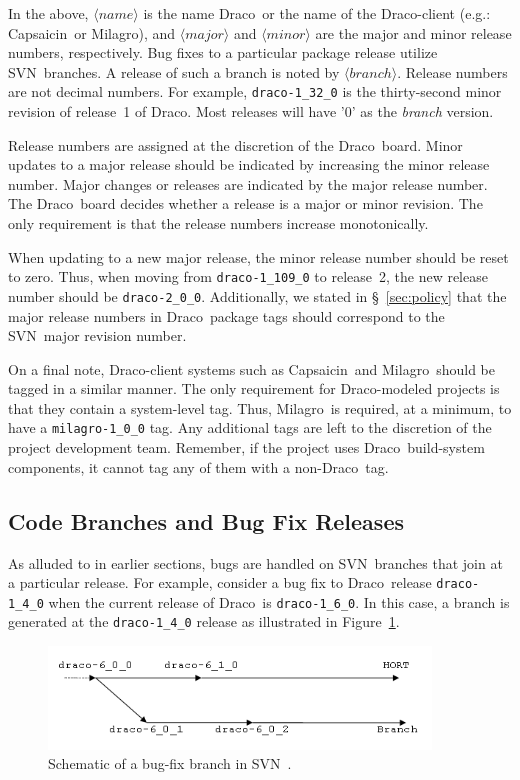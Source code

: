 \documentclass[note]{newmemo}
\newcommand{\draco}{{\normalfont\small\sffamily Draco}}
\newcommand{\milagro}{{\normalfont\small\sffamily Milagro}}
\newcommand{\capsaicin}{{\normalfont\small\sffamily Capsaicin}}
\newcommand{\svn}{\textsf{SVN}}
\begin{document}
In the above, $\langle\mathit{name}\rangle$ is the name \draco\ or the
name of the \draco-client (e.g.: \capsaicin\ or \milagro), and
$\langle\mathit{major}\rangle$ and $\langle\mathit{minor}\rangle$ are
the major and minor release numbers, respectively. Bug fixes to a
particular package release utilize \svn\  branches.  A release of
such a branch is noted by $\langle\mathit{branch}\rangle$.  Release
numbers are not decimal numbers.  For example, \texttt{draco-1\_32\_0}
is the thirty-second minor revision of release~1 of \draco.  Most
releases will have '0' as the \textit{branch} version.

Release numbers are assigned at the discretion of the \draco\ board.
Minor updates to a major release should be indicated by increasing the
minor release number.  Major changes or releases are indicated by the
major release number.  The \draco\ board decides whether a release is
a major or minor revision.  The only requirement is that the release
numbers increase monotonically.

When updating to a new major release, the minor release number should
be reset to zero.  Thus, when moving from \texttt{draco-1\_109\_0} to
release~2, the new release number should be \texttt{draco-2\_0\_0}.
Additionally, we stated in \S~\ref{sec:policy} that the major release
numbers in \draco\ package tags should correspond to the \svn\ major
revision number. 

On a final note, \draco-client systems such as \capsaicin\ and
\milagro\ should be tagged in a similar manner.  The only requirement
for \draco-modeled projects is that they contain a system-level tag.
Thus, \milagro\ is required, at a minimum, to have a
\texttt{milagro-1\_0\_0} tag.  Any additional tags are left to the
discretion of the project development team.  Remember, if the project
uses \draco\ build-system components, it cannot tag any of them with a
non-\draco\ tag.


\subsection{Code Branches and Bug Fix Releases}
\label{sec:code_branch}

As alluded to in earlier sections, bugs are handled on \svn\ branches
that join at a particular release.  For example, consider a bug fix to
\draco\ release \texttt{draco-1\_4\_0} when the current release of
\draco\ is \texttt{draco-1\_6\_0}.  In this case, a branch is
generated at the \texttt{draco-1\_4\_0} release as illustrated in
Figure~\ref{fig:branch}.
\begin{figure}
  \centerline{\includegraphics[width=4in]{branch-example.png}}
  \caption{Schematic of a bug-fix branch in \svn\ .}
  \label{fig:branch}
\end{figure}
\end{document}

